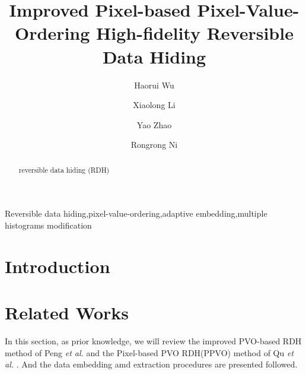 \documentclass[review,3p,10pt,sort&compress]{elsarticle}
\begin{document}
\begin{frontmatter}

\title {Improved Pixel-based Pixel-Value-Ordering High-fidelity Reversible Data Hiding}

\author{Haorui Wu}

\author{Xiaolong Li}

\author{Yao Zhao}

\author{Rongrong Ni}

\address[mymainaddress]{Institute of Information Science, Beijing Jiaotong University, Beijing 100044, China}
\address[mysecondaryaddress]{Beijing Key Laboratory of Advanced Information Science and Network Technology, Beijing 100044, China}

\begin{abstract}
reversible data hiding (RDH)
\end{abstract}


\begin{keyword}
   Reversible data hiding\sep pixel-value-ordering\sep adaptive embedding\sep multiple histograms modification
\end{keyword}

\end{frontmatter}

\section{Introduction}\label{sec:1}

\section{Related Works}\label{sec:2}
In this section, as prior knowledge, we will review the improved PVO-based RDH method of Peng \emph{et al.} \cite{Peng2014IPVO} and the Pixel-based PVO RDH(PPVO) method of Qu \emph{et al.} \cite{Qu2015PPVO}. And the data embedding amd extraction procedures are presented followed.
\end{document}
